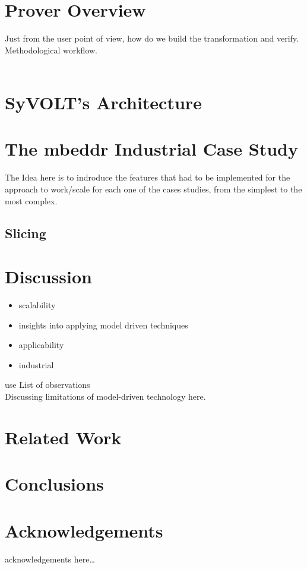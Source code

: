 \documentclass[conference]{IEEEtran}
\begin{document}
\section{Prover Overview}
Just from the user point of view, how do we build the transformation and
verify. Methodological workflow.\\\\


\section{SyVOLT's Architecture}
 

\section{The mbeddr Industrial Case Study}
\label{sec:mbeddr_case_study}

The Idea here is to indroduce the features that had to be implemented for the
approach to work/scale for each one of the cases studies, from the simplest to
the most complex.
\subsection{Slicing}

\section{Discussion}
\begin{itemize}
\item scalability
\item insights into applying model driven techniques
\item applicability
\item industrial
\end{itemize}
use List of observations\\
Discussing limitations of model-driven technology here.
 

\section{Related Work}


\section{Conclusions}


\section*{Acknowledgements}
acknowledgements here\ldots



\end{document}
